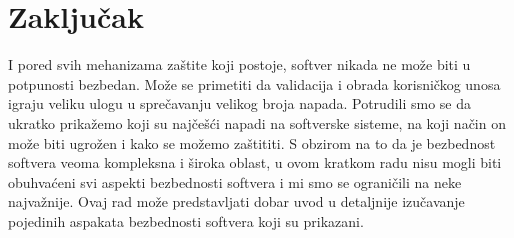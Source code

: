 \documentclass[a4paper]{article}
\begin{document}
\section{Zaključak}
\label{sec:zakljucak}
I pored svih mehanizama zaštite koji postoje, softver nikada ne može biti u potpunosti bezbedan. Može se primetiti da validacija i obrada korisničkog unosa igraju veliku ulogu u sprečavanju velikog broja napada. Potrudili smo se da ukratko prikažemo koji su najčešći napadi na softverske sisteme, na koji način on može biti ugrožen i kako se možemo zaštititi. S obzirom na to da je bezbednost softvera veoma kompleksna i široka oblast, u ovom kratkom radu nisu mogli biti obuhvaćeni svi aspekti bezbednosti softvera i mi smo se ograničili na neke najvažnije. Ovaj rad može predstavljati dobar uvod u detaljnije izučavanje pojedinih aspakata bezbednosti softvera koji su prikazani.

\appendix
 

\end{document}

